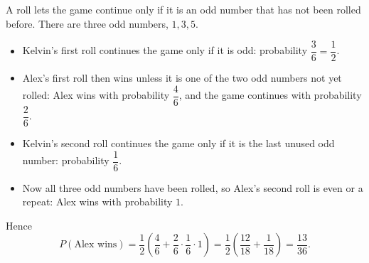A roll lets the game continue only if it is an odd number that has not been rolled before. There are three odd numbers, $1,3,5$.
\begin{itemize}
\item Kelvin's first roll continues the game only if it is odd: probability $\dfrac{3}{6}=\dfrac{1}{2}$.
\item Alex's first roll then wins unless it is one of the two odd numbers not yet rolled: Alex wins with probability $\dfrac{4}{6}$, and the game continues with probability $\dfrac{2}{6}$.
\item Kelvin's second roll continues the game only if it is the last unused odd number: probability $\dfrac{1}{6}$.
\item Now all three odd numbers have been rolled, so Alex's second roll is even or a repeat: Alex wins with probability $1$.
\end{itemize}
Hence
\[
P(\text{Alex wins})=\dfrac{1}{2}\left(\dfrac{4}{6}+\dfrac{2}{6}\cdot\dfrac{1}{6}\cdot1\right)=\dfrac{1}{2}\left(\dfrac{12}{18}+\dfrac{1}{18}\right)=\boxed{\dfrac{13}{36}} .
\]
